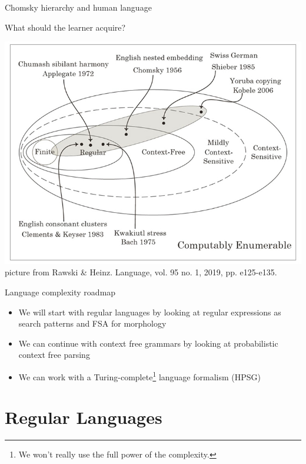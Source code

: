\documentclass{beamer}
\begin{document}
\begin{frame}{Chomsky hierarchy and human language}

  What should the learner acquire?

  \vspace{0.2cm}
  \includegraphics[width=.8\textwidth]{figures/fig03b}
  \tiny
  picture from Rawski \& Heinz. Language, vol. 95 no. 1, 2019, pp. e125-e135.
\end{frame}


\begin{frame}{Language complexity roadmap}
  \begin{itemize}
  \item We will start with regular languages by looking at regular
    expressions as search patterns and FSA for morphology 
  \item We can continue with context free grammars by looking at
    probabilistic context free parsing
  \item We can work with a Turing-complete\footnote{We won't really
      use the full power of the complexity.} language formalism (HPSG)
  \end{itemize}
\end{frame}

\section{Regular Languages}
\end{document}

